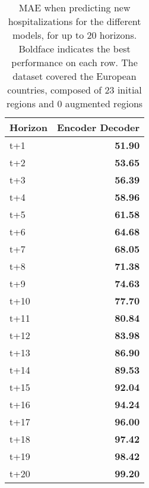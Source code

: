\begin{table}[H]
\centering
\caption{MAE when predicting new hospitalizations for the different models, for up to 20 horizons. Boldface indicates the best performance on each row. The dataset covered the European countries, composed of 23 initial regions and 0 augmented regions }
\label{tab:MAE_comparison}
\begin{tabular}{lr}
\toprule
Horizon &  Encoder Decoder \\
\midrule
t+1  & \textbf{51.90}  \\
t+2  & \textbf{53.65}  \\
t+3  & \textbf{56.39}  \\
t+4  & \textbf{58.96}  \\
t+5  & \textbf{61.58}  \\
t+6  & \textbf{64.68}  \\
t+7  & \textbf{68.05}  \\
t+8  & \textbf{71.38}  \\
t+9  & \textbf{74.63}  \\
t+10  & \textbf{77.70}  \\
t+11  & \textbf{80.84}  \\
t+12  & \textbf{83.98}  \\
t+13  & \textbf{86.90}  \\
t+14  & \textbf{89.53}  \\
t+15  & \textbf{92.04}  \\
t+16  & \textbf{94.24}  \\
t+17  & \textbf{96.00}  \\
t+18  & \textbf{97.42}  \\
t+19  & \textbf{98.42}  \\
t+20  & \textbf{99.20}  \\

\bottomrule
\end{tabular}
\end{table}

